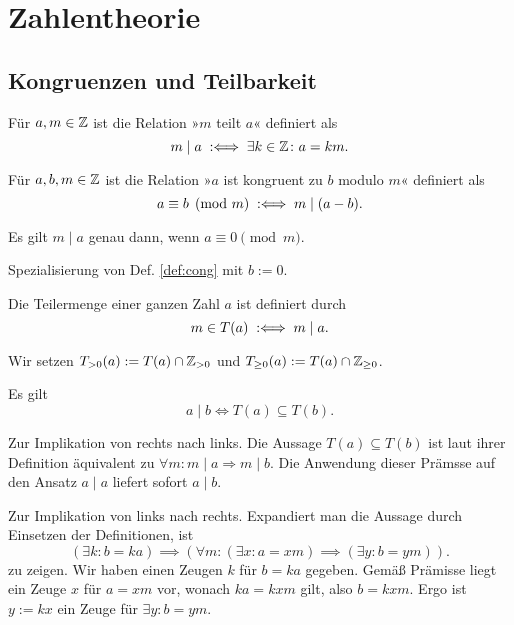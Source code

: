 
\chapter{Zahlentheorie}
\section{Kongruenzen und Teilbarkeit}

\begin{Definition}[Teiler] Für $a,m\in\mathbb Z$ ist die Relation »$m$ teilt
$a$« definiert als
\[m\mid a\;:\Longleftrightarrow\; \exists k\in\mathbb Z\colon a = km.\]
\end{Definition}

\begin{Definition}[Kongruenz]\label{def:cong}
Für $a,b,m\in\mathbb Z$ ist die Relation »$a$ ist kongruent zu $b$ modulo
$m$« definiert als
\[a\equiv b \pmod m \;:\Longleftrightarrow\; m\mid (a-b).\]
\end{Definition}

\begin{Korollar}
Es gilt $m\mid a$ genau dann, wenn $a\equiv 0\pmod m$.
\end{Korollar}
\begin{Beweis}
Spezialisierung von Def. \ref{def:cong} mit $b:=0$.\,\qedsymbol
\end{Beweis}

\begin{Definition}[Teilermenge] Die Teilermenge
einer ganzen Zahl $a$ ist definiert durch
\[m\in T(a)\;:\Longleftrightarrow\; m\mid a.\]
\end{Definition}
 Wir setzen $T_{>0}(a):=T(a)\cap\mathbb Z_{>0}$ und
$T_{\ge 0}(a):=T(a)\cap\mathbb Z_{\ge 0}$.

\begin{Korollar}\label{divisor-divisor-subset} Es gilt
\[a\mid b \iff T(a)\subseteq T(b).\]
\end{Korollar}
\begin{Beweis}
Zur Implikation von rechts nach links.
Die Aussage $T(a)\subseteq T(b)$ ist laut ihrer Definition
äquivalent zu $\forall m\colon m\mid a\Rightarrow m\mid b$.
Die Anwendung dieser Prämsse auf den Ansatz $a\mid a$
liefert sofort $a\mid b$.

Zur Implikation von links nach rechts. Expandiert man die Aussage
durch Einsetzen der Definitionen, ist
\[(\exists k\colon b=ka)\implies
(\forall m\colon (\exists x\colon a=xm)\implies (\exists y\colon b=ym)).\]
zu zeigen. Wir haben einen Zeugen $k$ für $b=ka$ gegeben. 
Gemäß Prämisse liegt ein Zeuge $x$ für $a=xm$ vor, wonach $ka=kxm$
gilt, also $b=kxm$. Ergo ist $y:=kx$ ein Zeuge für
$\exists y\colon b=ym$.\,\qedsymbol
\end{Beweis}

